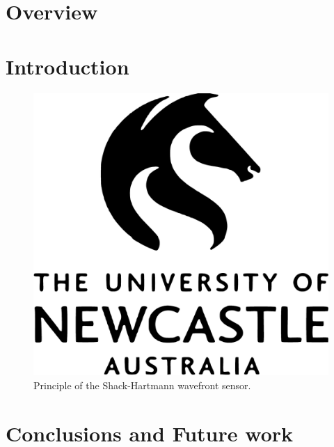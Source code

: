 \documentclass[a4paper,11pt,phdthesis,twoside,oneandhalfspace,pdflatex]{cssethesis} %
\begin{document}


\frontmatter					%

\thesistitlepage				%

\thesiscopyrightpage			%

\thesisdeclarationpage			%



\tableofcontents				%










\mainmatter	%



\chapter{Overview}
\lipsum[1-5]



\chapter{Introduction}
\lipsum[6-14]


\begin{figure}[ht!]
\centering\includegraphics[width=0.5\linewidth]{newcastleLogo}
\caption{Principle of the Shack-Hartmann wavefront sensor.}
\label{fig:ShackHartmannWFS}
\end{figure}



\chapter{Conclusions and Future work}\label{chap:summary}
\lipsum[16-24]


\backmatter %

\pagestyle{plain}

 
\end{document}
